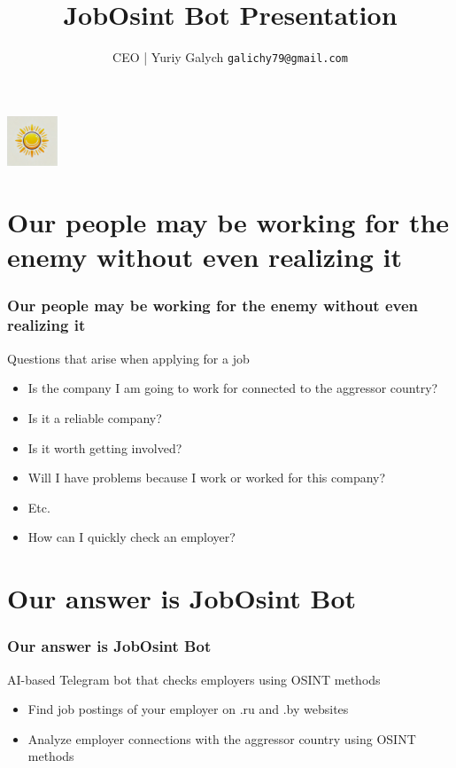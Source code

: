 \documentclass{beamer}
\title{JobOsint Bot Presentation}
\author{CEO | Yuriy Galych \newline \texttt{galichy79@gmail.com}}
\date{} %
\begin{document}
\begin{frame}
    \centering
    \includegraphics[height=1.5cm]{logo.png} %
    \vspace{1cm}
    \titlepage
\end{frame}


\section{Our people may be working for the enemy without even realizing it}

\begin{frame}
    \frametitle{Our people may be working for the enemy without even realizing it}
    
    \begin{block}{Questions that arise when applying for a job}
        \begin{itemize}
            \item Is the company I am going to work for connected to the aggressor country?
            \item Is it a reliable company?
            \item Is it worth getting involved?
            \item Will I have problems because I work or worked for this company?
            \item Etc.
            \item How can I quickly check an employer?
        \end{itemize}
    \end{block}
    
\end{frame}

\section{Our answer is JobOsint Bot}

\begin{frame}
    \frametitle{Our answer is JobOsint Bot}
    
    \begin{block}{AI-based Telegram bot that checks employers using OSINT methods}
        \begin{itemize}
            \item Find job postings of your employer on .ru and .by websites
            \item Analyze employer connections with the aggressor country using OSINT methods
        \end{itemize}
    \end{block}
    
\end{frame}
\end{document}
